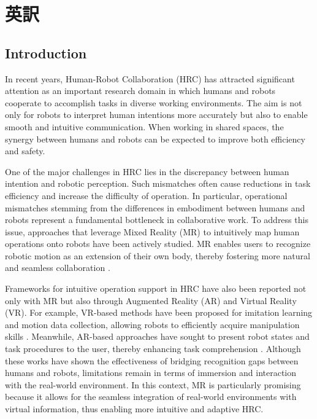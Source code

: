 \documentclass[../../main.tex]{subfiles} %
\begin{document}
\setcounter{page}{0} %

\chapter{英訳}\label{chap:introduction}
\section{Introduction}

In recent years, Human-Robot Collaboration (HRC) has attracted significant
attention as an important research domain in which humans and robots 
cooperate to accomplish tasks in diverse working environments\cite{HRC1}\cite{HRC2}. The aim is 
not only for robots to interpret human intentions more accurately but 
also to enable smooth and intuitive communication. When working in shared spaces, 
the synergy between humans and robots can be expected to improve both efficiency and safety.

One of the major challenges in HRC lies in the discrepancy between human 
intention and robotic perception. Such mismatches often cause reductions 
in task efficiency and increase the difficulty of operation. In particular, 
operational mismatches stemming from the differences in embodiment between 
humans and robots represent a fundamental bottleneck in collaborative work. 
To address this issue, approaches that leverage Mixed Reality (MR) 
to intuitively map human operations onto robots have been actively 
studied. MR enables users to recognize robotic motion 
as an extension of their own body, thereby fostering more 
natural and seamless collaboration \cite{MR1}\cite{MR2}\cite{MR3}\cite{MR4}\cite{MR5}.

Frameworks for intuitive operation support in HRC have also been reported 
not only with MR but also through Augmented Reality (AR) and Virtual Reality (VR). 
For example, VR-based methods have been proposed for imitation learning and motion data 
collection, allowing robots to efficiently acquire manipulation skills \cite{VR1} \cite{VR2}\cite{VR3}. 
Meanwhile, AR-based approaches have sought to present robot states and task procedures 
to the user, thereby enhancing task comprehension \cite{AR1} \cite{AR2}\cite{AR3}. Although these works have shown 
the effectiveness of bridging recognition gaps between humans and robots, 
limitations remain in terms of immersion and interaction with the real-world environment. 
In this context, MR is particularly promising because it allows for the seamless integration 
of real-world environments with virtual information, 
thus enabling more intuitive and adaptive HRC.
\end{document}
